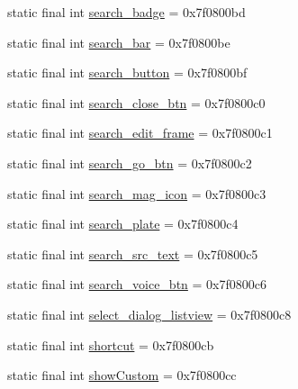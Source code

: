 \begin{DoxyCompactItemize}
\item 
static final int \mbox{\hyperlink{classcom_1_1google_1_1android_1_1gms_1_1R_1_1id_ad26d45411089c27621a12beb1cdf1aa8}{search\+\_\+badge}} = 0x7f0800bd
\item 
static final int \mbox{\hyperlink{classcom_1_1google_1_1android_1_1gms_1_1R_1_1id_a644ac086f9c21f1291bd4aa18290a843}{search\+\_\+bar}} = 0x7f0800be
\item 
static final int \mbox{\hyperlink{classcom_1_1google_1_1android_1_1gms_1_1R_1_1id_a4b82c95808b44cd4c56cbe144d1a7191}{search\+\_\+button}} = 0x7f0800bf
\item 
static final int \mbox{\hyperlink{classcom_1_1google_1_1android_1_1gms_1_1R_1_1id_a9217faad0a47f83e49e90290157e1626}{search\+\_\+close\+\_\+btn}} = 0x7f0800c0
\item 
static final int \mbox{\hyperlink{classcom_1_1google_1_1android_1_1gms_1_1R_1_1id_abb26f9102db63593cc52e6cdaad79ec9}{search\+\_\+edit\+\_\+frame}} = 0x7f0800c1
\item 
static final int \mbox{\hyperlink{classcom_1_1google_1_1android_1_1gms_1_1R_1_1id_aeea7825f86089a10d97b7d1fded0c034}{search\+\_\+go\+\_\+btn}} = 0x7f0800c2
\item 
static final int \mbox{\hyperlink{classcom_1_1google_1_1android_1_1gms_1_1R_1_1id_ae2020a9caa7184af9dd91a051e03b706}{search\+\_\+mag\+\_\+icon}} = 0x7f0800c3
\item 
static final int \mbox{\hyperlink{classcom_1_1google_1_1android_1_1gms_1_1R_1_1id_ab46a3cfc4b3dfd8aca3f73cbd1521d98}{search\+\_\+plate}} = 0x7f0800c4
\item 
static final int \mbox{\hyperlink{classcom_1_1google_1_1android_1_1gms_1_1R_1_1id_a42cfc4948a219dd54c95f29b6c6c1eb1}{search\+\_\+src\+\_\+text}} = 0x7f0800c5
\item 
static final int \mbox{\hyperlink{classcom_1_1google_1_1android_1_1gms_1_1R_1_1id_a8793761ed0ce0d6f8ed2ede5c2143a1e}{search\+\_\+voice\+\_\+btn}} = 0x7f0800c6
\item 
static final int \mbox{\hyperlink{classcom_1_1google_1_1android_1_1gms_1_1R_1_1id_aab74ed92db76d6ce4c828ea8872b95c4}{select\+\_\+dialog\+\_\+listview}} = 0x7f0800c8
\item 
static final int \mbox{\hyperlink{classcom_1_1google_1_1android_1_1gms_1_1R_1_1id_a7378106bcff01edfff2f7f8dce64a147}{shortcut}} = 0x7f0800cb
\item 
static final int \mbox{\hyperlink{classcom_1_1google_1_1android_1_1gms_1_1R_1_1id_a25cf0f6c6a8d204e272706955117064b}{show\+Custom}} = 0x7f0800cc

\end{DoxyCompactItemize}
